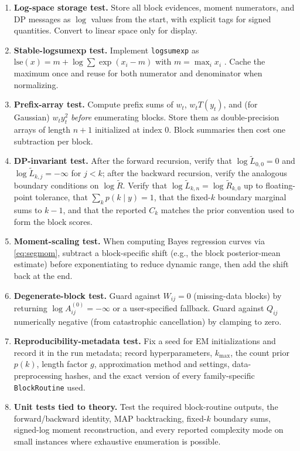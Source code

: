 \begin{enumerate}\itemsep2pt
\item \textbf{Log-space storage test.} Store all block evidences, moment numerators, and DP
messages as $\log$ values from the start, with explicit tags for signed quantities. Convert to
linear space only for display.
\item \textbf{Stable-logsumexp test.} Implement \texttt{logsumexp} as
$\mathrm{lse}(x)=m+\log\sum\exp(x_i-m)$ with $m=\max_i x_i$ \citep{blanchard2021lse}. Cache the
maximum once and reuse for both numerator and denominator when normalizing.
\item \textbf{Prefix-array test.} Compute prefix sums of $w_t$, $w_t T(y_t)$, and
(for Gaussian) $w_t y_t^2$ \emph{before} enumerating blocks. Store them as double-precision arrays
of length $n+1$ initialized at index 0. Block summaries then cost one subtraction per block.
\item \textbf{DP-invariant test.} After the forward recursion, verify that
$\log\widetilde L_{0,0}=0$ and $\log\widetilde L_{k,j}=-\infty$ for $j<k$; after the backward
recursion, verify the analogous boundary conditions on $\log\widetilde R$. Verify that
$\log\widetilde L_{k,n}=\log\widetilde R_{k,0}$ up to floating-point tolerance, that
$\sum_k p(k\mid y)=1$, that the fixed-$k$ boundary marginal sums to $k-1$, and that the reported
$C_k$ matches the prior convention used to form the block scores.
\item \textbf{Moment-scaling test.} When computing Bayes regression curves via \eqref{eq:segmom},
subtract a block-specific shift (e.g., the block posterior-mean estimate) before exponentiating
to reduce dynamic range, then add the shift back at the end.
\item \textbf{Degenerate-block test.} Guard against $W_{ij}=0$ (missing-data blocks) by returning
$\log A^{(0)}_{ij}=-\infty$ or a user-specified fallback. Guard against $Q_{ij}$ numerically
negative (from catastrophic cancellation) by clamping to zero.
\item \textbf{Reproducibility-metadata test.} Fix a seed for EM initializations and record it in the run
metadata; record hyperparameters, $k_{\max}$, the count prior $p(k)$, length factor $g$, approximation
method and settings, data-preprocessing hashes, and the exact version of every family-specific
\texttt{BlockRoutine} used.
\item \textbf{Unit tests tied to theory.} Test the required block-routine outputs, the forward/backward
identity, MAP backtracking, fixed-$k$ boundary sums, signed-log moment reconstruction, and every
reported complexity mode on small instances where exhaustive enumeration is possible.
\end{enumerate}
